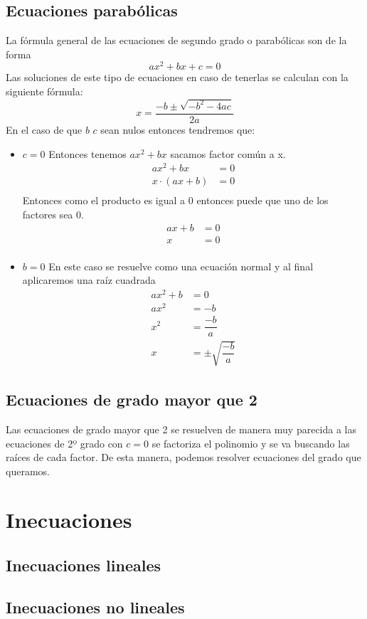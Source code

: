 \section{Ecuaciones parabólicas}
\noindent
La fórmula general de las ecuaciones de segundo grado o parabólicas son de la forma 
\begin{equation*}
ax^2+bx+c=0
\end{equation*}
\noindent
Las soluciones de este tipo de ecuaciones en caso de tenerlas se calculan con la siguiente fórmula:
\begin{equation*}
x=\dfrac{-b\pm \sqrt{-b^2-4ac}}{2a}
\end{equation*}
\noindent
En el caso de que $b$  $c$ sean nulos entonces tendremos que:
\begin{itemize}
\item $c=0$ Entonces tenemos $ax^2+bx$ sacamos factor común a x.
\begin{align*}
ax^2+bx&=0\\
x\cdot(ax+b)&=0\\
\end{align*}
Entonces como el producto es igual a 0 entonces puede que uno de los factores sea 0.
\begin{align*}
ax+b&=0\\
x&=0\\
\end{align*}
\item $b=0$ En este caso se resuelve como una ecuación normal y al final aplicaremos una raíz cuadrada
\begin{align*}
ax^2+b&=0\\
ax^2&=-b\\
x^2&=\dfrac{-b}{a}\\
x&=\pm \sqrt{\dfrac{-b}{a}}
\end{align*}

\end{itemize}
\section{Ecuaciones de grado mayor que 2}
\noindent
Las ecuaciones de grado mayor que 2 se resuelven de manera muy parecida a las ecuaciones de 2º grado con $c=0$ se factoriza el polinomio y se va buscando las raíces de cada factor. De esta manera, podemos resolver ecuaciones del grado que queramos.

\chapter{Inecuaciones}
\minitoc

\section{Inecuaciones lineales}
\section{Inecuaciones no lineales}


